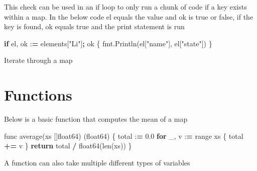 \documentclass[]{book}
\newenvironment{Shaded}{\begin{snugshade}}{\end{snugshade}}
\newcommand{\BuiltInTok}[1]{#1}
\newcommand{\CharTok}[1]{\textcolor[rgb]{0.31,0.60,0.02}{#1}}
\newcommand{\ControlFlowTok}[1]{\textcolor[rgb]{0.13,0.29,0.53}{\textbf{#1}}}
\newcommand{\FloatTok}[1]{\textcolor[rgb]{0.00,0.00,0.81}{#1}}
\newcommand{\NormalTok}[1]{#1}
\newcommand{\OperatorTok}[1]{\textcolor[rgb]{0.81,0.36,0.00}{\textbf{#1}}}
\newcommand{\SpecialCharTok}[1]{\textcolor[rgb]{0.00,0.00,0.00}{#1}}
\newcommand{\StringTok}[1]{\textcolor[rgb]{0.31,0.60,0.02}{#1}}
\begin{document}
This check can be used in an if loop to only run a chunk of code if a key exists within a map. In the below code el equals the value and ok is true or false, if the key is found, ok equals true and the print statement is run

\begin{Shaded}
\begin{Highlighting}[]
\ControlFlowTok{if}\NormalTok{ el, ok :}\OperatorTok{=}\NormalTok{ elements[}\StringTok{"Li"}\NormalTok{]}\OperatorTok{;}\NormalTok{ ok \{}
\NormalTok{fmt.Println(el[}\StringTok{"name"}\NormalTok{], el[}\StringTok{"state"}\NormalTok{])}
\NormalTok{\}}
\end{Highlighting}
\end{Shaded}

Iterate through a map

\begin{Shaded}
\end{Shaded}

\hypertarget{functions}{%
\section{Functions}\label{functions}}

Below is a basic function that computes the mean of a map

\begin{Shaded}
\begin{Highlighting}[]
\NormalTok{func average(xs []float64) (float64) \{}
\NormalTok{    total :}\OperatorTok{=} \FloatTok{0.0}                      
    \ControlFlowTok{for}\NormalTok{ _, v :}\OperatorTok{=} \BuiltInTok{range}\NormalTok{ xs \{            }
\NormalTok{        total }\OperatorTok{+=}\NormalTok{ v                    }
\NormalTok{    \}}
    \ControlFlowTok{return}\NormalTok{ total }\OperatorTok{/}\NormalTok{ float64(}\BuiltInTok{len}\NormalTok{(xs))   }
\NormalTok{\}                                     }
\end{Highlighting}
\end{Shaded}

A function can also take multiple different types of variables
\end{document}
